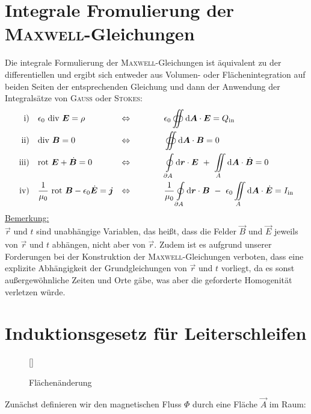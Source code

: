 \section{Integrale Fromulierung der \textsc{Maxwell}-Gleichungen}
Die integrale Formulierung der \textsc{Maxwell}-Gleichungen ist äquivalent zu der differentiellen und ergibt sich entweder aus Volumen- oder Flächenintegration auf beiden Seiten der entsprechenden Gleichung und dann der Anwendung der Integralsätze von \textsc{Gauss} oder \textsc{Stokes}:
\ \\
\begin{align*}
\text{i)} \quad & \epsilon_0 \ \div \vec{E} = \rho & \Leftrightarrow \qquad\qquad & \epsilon_0\oiint \mathrm{d}\vec{A} \cdot\vec{E} = Q_{\text{in}} \\
\text{ii)} \quad & \div\vec{B} = 0 & \Leftrightarrow \qquad\qquad & \oiint \mathrm{d}\vec{A}\cdot\vec{B} = 0 \\
\text{iii)} \quad & \rot \vec{E} + \dot{\vec{B}} = 0 & \Leftrightarrow \qquad\qquad & \oint\limits_{\partial A} \mathrm{d}\vec{r}\cdot\vec{E} \ + \ \iint\limits_A \mathrm{d}\vec{A}\cdot\dot{\vec{B}} = 0 \\
\text{iv)} \quad & \frac{1}{\mu_0} \ \rot \vec{B} - \epsilon_0 \dot{\vec{E}} = \vec{j} & \Leftrightarrow \qquad\qquad & \frac{1}{\mu_0}\oint\limits_{\partial A}\mathrm{d}\vec{r}\cdot\vec{B} \ - \ \epsilon_0\iint\limits_A\mathrm{d}\vec{A}\cdot\dot{\vec{E}} = I_{\text{in}}
\end{align*}
\newpage
\underline{Bemerkung:}\\

$\vec{r}$ und $t$ sind unabhängige Variablen, das heißt, dass die Felder $\vec{B}$ und $\vec{E}$ jeweils von $\vec{r}$ und $t$ abhängen, nicht aber von $\dot{\vec{r}}$.
Zudem ist es aufgrund unserer Forderungen bei der Konstruktion der \textsc{Maxwell}-Gleichungen verboten, dass eine explizite Abhängigkeit der Grundgleichungen von $\vec{r}$ und $t$ vorliegt, da es sonst außergewöhnliche Zeiten und Orte gäbe, was aber die geforderte Homogenität verletzen würde.
\section{Induktionsgesetz für Leiterschleifen}

\begin{wrapfigure}[]{l}[0cm]{0cm}
	\raisebox{0pt}[\dimexpr{}\baselineskip\relax]{
		\colorbox{hgrey}{
		}
	}
	\caption{Flächenänderung}
\end{wrapfigure}
Zunächst definieren wir den magnetischen Fluss $\Phi$ durch eine Fläche $\vec{A}$ im Raum:

